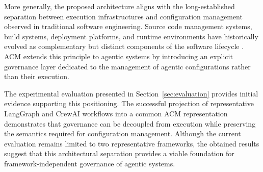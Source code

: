 \documentclass[10pt]{article}
\begin{document}
More generally, the proposed architecture aligns with the long-established separation between execution infrastructures and configuration management observed in traditional software engineering. Source code management systems, build systems, deployment platforms, and runtime environments have historically evolved as complementary but distinct components of the software lifecycle \cite{ref25}. ACM extends this principle to agentic systems by introducing an explicit governance layer dedicated to the management of agentic configurations rather than their execution.

The experimental evaluation presented in Section~\ref{sec:evaluation} provides initial evidence supporting this positioning. The successful projection of representative LangGraph and CrewAI workflows into a common ACM representation demonstrates that governance can be decoupled from execution while preserving the semantics required for configuration management. Although the current evaluation remains limited to two representative frameworks, the obtained results suggest that this architectural separation provides a viable foundation for framework-independent governance of agentic systems.
\end{document}

